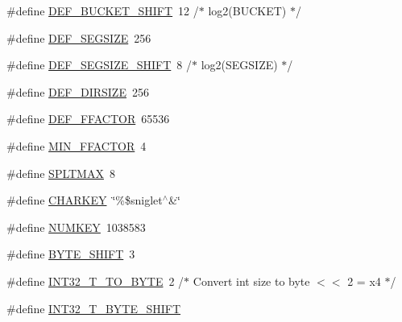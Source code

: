 \begin{DoxyCompactItemize}
\item 
\#define \mbox{\hyperlink{adat-devel_2other__libs_2filedb_2filehash_2ffdb__hash_8h_a94d649e1a4b4875af299406d00d90179}{D\+E\+F\+\_\+\+B\+U\+C\+K\+E\+T\+\_\+\+S\+H\+I\+FT}}~12		/$\ast$ log2(B\+U\+C\+K\+ET) $\ast$/
\item 
\#define \mbox{\hyperlink{adat-devel_2other__libs_2filedb_2filehash_2ffdb__hash_8h_a933af448287323dc20a3710cf2853fea}{D\+E\+F\+\_\+\+S\+E\+G\+S\+I\+ZE}}~256
\item 
\#define \mbox{\hyperlink{adat-devel_2other__libs_2filedb_2filehash_2ffdb__hash_8h_a4e330302396744e50bdeb73a63271af4}{D\+E\+F\+\_\+\+S\+E\+G\+S\+I\+Z\+E\+\_\+\+S\+H\+I\+FT}}~8		/$\ast$ log2(S\+E\+G\+S\+I\+ZE)	 $\ast$/
\item 
\#define \mbox{\hyperlink{adat-devel_2other__libs_2filedb_2filehash_2ffdb__hash_8h_a10fd3374f1b04754490afaed233cf88e}{D\+E\+F\+\_\+\+D\+I\+R\+S\+I\+ZE}}~256
\item 
\#define \mbox{\hyperlink{adat-devel_2other__libs_2filedb_2filehash_2ffdb__hash_8h_aae70466cd3729fc8fbbb17a11e8ec2c2}{D\+E\+F\+\_\+\+F\+F\+A\+C\+T\+OR}}~65536
\item 
\#define \mbox{\hyperlink{adat-devel_2other__libs_2filedb_2filehash_2ffdb__hash_8h_a43d3f768ecbc952d3d84bc4602fa8bfa}{M\+I\+N\+\_\+\+F\+F\+A\+C\+T\+OR}}~4
\item 
\#define \mbox{\hyperlink{adat-devel_2other__libs_2filedb_2filehash_2ffdb__hash_8h_a24fe9da2ed1da9fe5bd1ed053816820c}{S\+P\+L\+T\+M\+AX}}~8
\item 
\#define \mbox{\hyperlink{adat-devel_2other__libs_2filedb_2filehash_2ffdb__hash_8h_abe28a5d5dffd4952a50ad855ac62c662}{C\+H\+A\+R\+K\+EY}}~\char`\"{}\%\$sniglet$^\wedge$\&\char`\"{}
\item 
\#define \mbox{\hyperlink{adat-devel_2other__libs_2filedb_2filehash_2ffdb__hash_8h_a0521fdbfcc9c75a79525dbb9603ffcb8}{N\+U\+M\+K\+EY}}~1038583
\item 
\#define \mbox{\hyperlink{adat-devel_2other__libs_2filedb_2filehash_2ffdb__hash_8h_a068d9fd20e19b67b43e06b244fac64f9}{B\+Y\+T\+E\+\_\+\+S\+H\+I\+FT}}~3
\item 
\#define \mbox{\hyperlink{adat-devel_2other__libs_2filedb_2filehash_2ffdb__hash_8h_a18805481a1274a8b9be6444163841dbc}{I\+N\+T32\+\_\+\+T\+\_\+\+T\+O\+\_\+\+B\+Y\+TE}}~2    /$\ast$ Convert int size to byte $<$$<$ 2  = x4 $\ast$/
\item 
\#define \mbox{\hyperlink{adat-devel_2other__libs_2filedb_2filehash_2ffdb__hash_8h_a401a154aa403e8e7167309e317ac8f2f}{I\+N\+T32\+\_\+\+T\+\_\+\+B\+Y\+T\+E\+\_\+\+S\+H\+I\+FT}}
$$
\end{DoxyCompactItemize}

